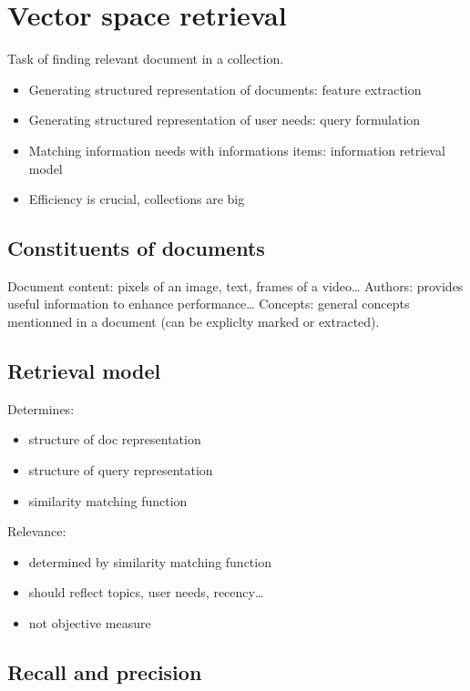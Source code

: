 \section{Vector space retrieval}
Task of finding relevant document in a collection.

\begin{itemize}
\item Generating structured representation of documents: feature extraction
\item Generating structured representation of user needs: query
  formulation
\item Matching information needs with informations items:
  information retrieval model
\item Efficiency is crucial, collections are big
\end{itemize}

\subsection{Constituents of documents}

Document content: pixels of an image, text, frames of a video\ldots
Authors: provides useful information to enhance performance\ldots
Concepts: general concepts mentionned in a document (can be expliclty
marked or extracted).

\subsection{Retrieval model}

Determines:
\begin{itemize}

\item structure of doc representation
\item structure of query representation
\item similarity matching function

\end{itemize}
Relevance:
\begin{itemize}
\item determined by similarity matching function
\item should reflect topics, user needs, recency\ldots
\item not objective measure
\end{itemize}

\subsection{Recall and precision}

